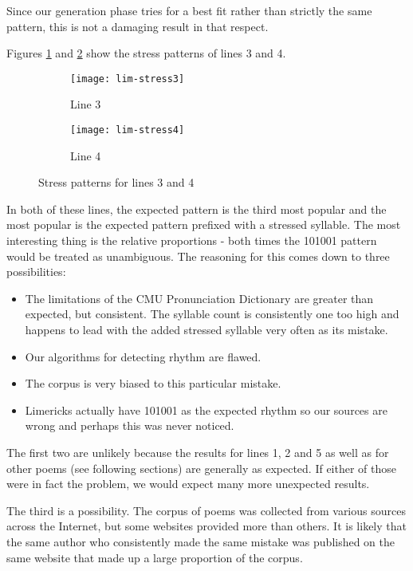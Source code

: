 \begin{description}
Since our generation phase tries for a best fit rather than strictly the same pattern, this is not a damaging result in that respect.

Figures \ref{fig:lim-stress3} and \ref{fig:lim-stress4} show the stress patterns of lines 3 and 4. 

\begin{figure}[H]
\centering
\begin{subfigure}[t]{0.5\textwidth}
	\centering
    \texttt{[image: lim-stress3]}
    \caption{Line 3}
    \label{fig:lim-stress3}
\end{subfigure}
\begin{subfigure}[t]{0.5\textwidth}
	\centering
    \texttt{[image: lim-stress4]}
    \caption{Line 4}
    \label{fig:lim-stress4}
\end{subfigure}
\caption{Stress patterns for lines 3 and 4}
\label{fig:lim4}
\end{figure}

In both of these lines, the expected pattern is the third most popular and the most popular is the expected pattern prefixed with a stressed syllable. The most interesting thing is the relative proportions - both times the 101001 pattern would be treated as unambiguous. The reasoning for this comes down to three possibilities:
\begin{itemize}
\item{The limitations of the CMU Pronunciation Dictionary are greater than expected, but consistent. The syllable count is consistently one too high and happens to lead with the added stressed syllable very often as its mistake.}
\item{Our algorithms for detecting rhythm are flawed.}
\item{The corpus is very biased to this particular mistake.}
\item{Limericks actually have 101001 as the expected rhythm so our sources are wrong and perhaps this was never noticed.}
\end{itemize}

The first two are unlikely because the results for lines 1, 2 and 5 as well as for other poems (see following sections) are generally as expected. If either of those were in fact the problem, we would expect many more unexpected results.

The third is a possibility. The corpus of poems was collected from various sources across the Internet, but some websites provided more than others. It is likely that the same author who consistently made the same mistake was published on the same website that made up a large proportion of the corpus.


\end{description}
